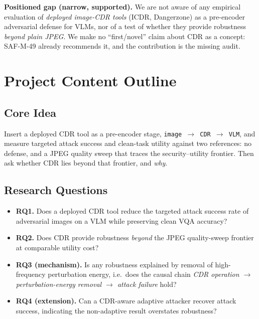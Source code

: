 \documentclass[11pt]{article}
\begin{document}
\noindent\textbf{Positioned gap (narrow, supported).} We are not aware of any
empirical evaluation of \emph{deployed image-CDR tools} (ICDR, Dangerzone) as a
pre-encoder adversarial defense for VLMs, nor of a test of whether they provide
robustness \emph{beyond plain JPEG}. We make no ``first/novel'' claim about CDR as
a concept: SAF-M-49 already recommends it, and the contribution is the missing audit.

\section{Project Content Outline}

\subsection{Core Idea}
Insert a deployed CDR tool as a pre-encoder stage,
\texttt{image $\rightarrow$ CDR $\rightarrow$ VLM}, and measure targeted attack
success and clean-task utility against two references: no defense, and a JPEG
quality sweep that traces the security--utility frontier. Then ask whether CDR
lies beyond that frontier, and \emph{why}.

\subsection{Research Questions}
\begin{itemize}
\item \textbf{RQ1.} Does a deployed CDR tool reduce the targeted attack success
      rate of adversarial images on a VLM while preserving clean VQA accuracy?
\item \textbf{RQ2.} Does CDR provide robustness \emph{beyond} the JPEG
      quality-sweep frontier at comparable utility cost?
\item \textbf{RQ3 (mechanism).} Is any robustness explained by removal of
      high-frequency perturbation energy, i.e.\ does the causal chain
      \emph{CDR operation $\to$ perturbation-energy removal $\to$ attack failure}
      hold?
\item \textbf{RQ4 (extension).} Can a CDR-aware adaptive attacker recover attack
      success, indicating the non-adaptive result overstates robustness?
\end{itemize}
\end{document}
